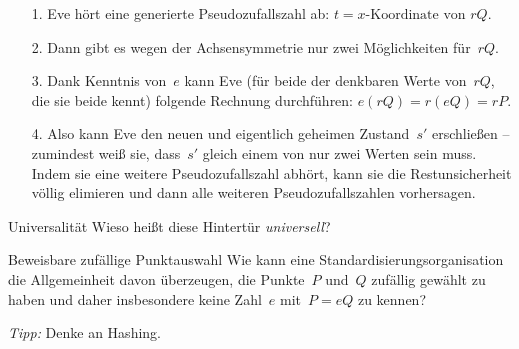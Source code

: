 \documentclass{zirkelblatt}
\begin{document}
\begin{enumerate}
\item[1.] Eve hört eine generierte Pseudozufallszahl ab: $t =
\text{$x$-Koordinate von~$rQ$}$.
\item[2.] Dann gibt es wegen der Achsensymmetrie nur zwei Möglichkeiten
für~$rQ$.
\item[3.] Dank Kenntnis von~$e$ kann Eve (für beide der denkbaren Werte
von~$rQ$, die sie beide kennt) folgende Rechnung durchführen: $e(rQ) = r(eQ) =
rP$.
\item[4.] Also kann Eve den neuen und eigentlich geheimen Zustand~$s'$
erschließen -- zumindest weiß sie, dass~$s'$ gleich einem von nur zwei Werten
sein muss. Indem sie eine weitere Pseudozufallszahl abhört, kann sie die
Restunsicherheit völlig elimieren und dann alle weiteren Pseudozufallszahlen
vorhersagen.
\end{enumerate}

\begin{aufgabeShaded}{Universalität}
Wieso heißt diese Hintertür \emph{universell}?
\end{aufgabeShaded}

\begin{aufgabeShaded}{Beweisbare zufällige Punktauswahl}
Wie kann eine Standardisierungsorganisation die Allgemeinheit davon überzeugen,
die Punkte~$P$ und~$Q$ zufällig gewählt zu haben und daher insbesondere keine
Zahl~$e$ mit~$P = eQ$ zu kennen?

\emph{Tipp:} Denke an Hashing.
\end{aufgabeShaded}

\renewcommand{\thefootnote}{\fnsymbol{footnote}}
\end{document}

